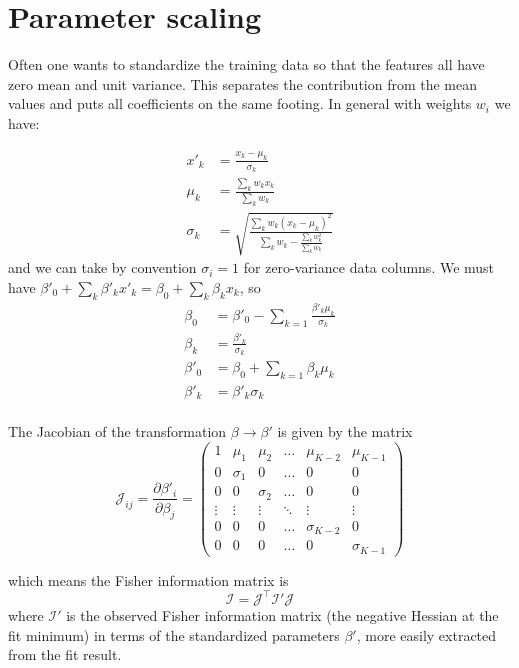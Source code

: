 \documentclass{article}
\begin{document}
\section{Parameter scaling}

Often one wants to standardize the training data so that the features all have
zero mean and unit variance. This separates the contribution from the mean
values and puts all coefficients on the same footing. In general with weights
$w_i$ we have:

\begin{align}
  x'_k &= \frac{x_k - \mu_k}{\sigma_k} \\
  \mu_k &= \frac{\sum_k w_k x_k}{\sum_k w_k} \\
  \sigma_k &= \sqrt{\frac{\sum_k w_k (x_k - \mu_k)^2}{\sum_k w_k - \frac{\sum_k w_k^2}{\sum_k w_k}}}
\end{align}
and we can take by convention $\sigma_i = 1$ for zero-variance data columns. We
must have \(\beta'_0 + \sum_k \beta'_k x'_k = \beta_0 + \sum_k \beta_k x_k\), so
\begin{align}
  \beta_0 &= \beta'_0 - \sum_{k=1} \frac{\beta'_k \mu_k}{\sigma_k} \\
  \beta_k &= \frac{\beta'_k}{\sigma_k} \\
  \beta'_0 &= \beta_0 + \sum_{k=1} \beta_k \mu_k \\
  \beta'_k &= \beta'_k \sigma_k \\
\end{align}

The Jacobian of the transformation $\beta \rightarrow \beta'$ is given by the matrix
\begin{equation}
  \boldsymbol{\mathcal{J}}_{ij} = \frac{\partial \beta'_i}{\partial \beta_j} = \begin{pmatrix}
    1      & \mu_1 & \mu_2 & \ldots & \mu_{K-2} & \mu_{K-1} \\
    0      & \sigma_1 & 0 & \ldots & 0 & 0\\
    0      & 0 & \sigma_2 & \ldots & 0 & 0 \\
    \vdots  & \vdots & \vdots   & \ddots & \vdots & \vdots   \\
    0      & 0 & 0 & \ldots & \sigma_{K-2} & 0 \\
    0      & 0 & 0 & \ldots & 0 & \sigma_{K-1} \end{pmatrix}
\end{equation}

which means the Fisher information matrix is
\begin{equation}
  \boldsymbol{\mathcal{I}} = \boldsymbol{\mathcal{J}}^\intercal \boldsymbol{\mathcal{I}}'\boldsymbol{\mathcal{J}}
\end{equation}
where \(\boldsymbol{\mathcal{I}}'\) is the observed Fisher information matrix
(the negative Hessian at the fit minimum) in terms of the standardized
parameters $\beta'$, more easily extracted from the fit result.
\end{document}
